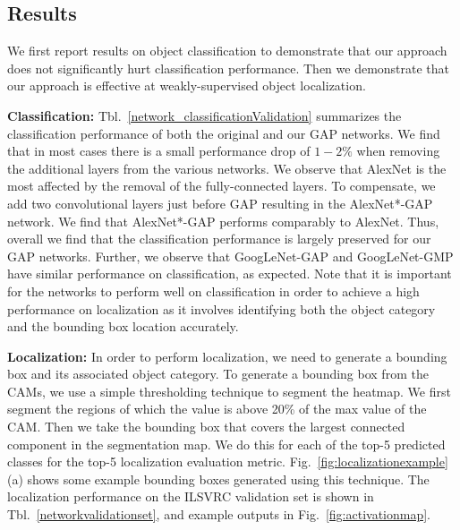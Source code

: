 \documentclass[10pt,twocolumn,letterpaper]{article}
\begin{document}
\subsection{Results}
\label{sec:locresults}
We first report results on object classification to demonstrate that our approach does not significantly hurt classification performance. Then we demonstrate that our approach is effective at weakly-supervised object localization.

\textbf{Classification:} Tbl.~\ref{network_classificationValidation} summarizes the classification performance of both the original and our GAP networks. We find that in most cases there is a small performance drop of $1 - 2\%$ when removing the additional layers from the various networks. We observe that AlexNet is the most affected by the removal of the fully-connected layers. To compensate, we add two convolutional layers just before GAP resulting in the AlexNet*-GAP network. We find that AlexNet*-GAP performs comparably to AlexNet. Thus, overall we find that the classification performance is largely preserved for our GAP networks. Further, we observe that GoogLeNet-GAP and GoogLeNet-GMP have similar performance on classification, as expected. Note that it is important for the networks to perform well on classification in order to achieve a high performance on localization as it involves identifying both the object category and the bounding box location accurately.

\textbf{Localization:} In order to perform localization, we need to generate a bounding box and its associated object category. To generate a bounding box from the CAMs, we use a simple thresholding technique to segment the heatmap. We first segment the regions of which the value is above 20\% of the max value of the CAM. Then we take the bounding box that covers the largest connected component in the segmentation map. We do this for each of the top-5 predicted classes for the top-5 localization evaluation metric. Fig.~\ref{fig:localizationexample}(a) shows some example bounding boxes generated using this technique. The localization performance on the ILSVRC validation set is shown in Tbl.~\ref{networkvalidationset}, and example outputs in Fig.~\ref{fig:activationmap}.
\end{document}
